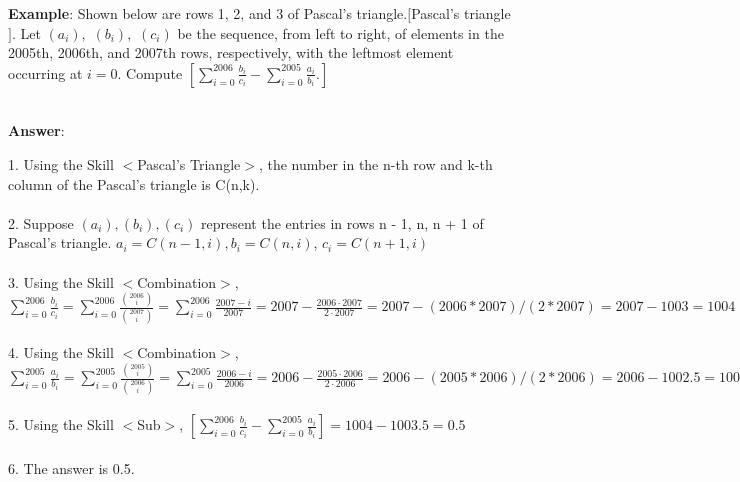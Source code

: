 \documentclass{article} %
\begin{document}
\begin{tcolorbox}[title = {An Example of Skill Composition for MATH}, colback = Apricot!25!white, colframe = BrickRed!75!black] 
\textbf{Example}: Shown below are rows 1, 2, and 3 of Pascal's triangle.$[$Pascal's triangle$]$. Let $(a_i),$ $(b_i),$ $(c_i)$ be the sequence, from left to right, of elements in the 2005th, 2006th, and 2007th rows, respectively, with the leftmost element occurring at $i = 0.$  Compute $[\sum_{i = 0}^{2006} \frac{b_i}{c_i} - \sum_{i = 0}^{2005} \frac{a_i}{b_i}.]$ \\ \\
 \quad

\textbf{Answer}:

1. Using the Skill $<$Pascal's Triangle$>$, the number in the n-th row and k-th column of the Pascal's triangle is C(n,k). \\ \\
2. Suppose $(a_i), (b_i), (c_i)$ represent the entries in rows n - 1, n, n + 1 of Pascal's triangle. $a_i = C(n-1, i), b_i = C(n, i)$, $c_i = C(n+1, i)$ \\ \\
3. Using the Skill $<$Combination$>$, $\sum_{i = 0}^{2006} \frac{b_i}{c_i} = \sum_{i = 0}^{2006} \frac{\binom{2006}{i}}{\binom{2007}{i}} = \sum_{i = 0}^{2006} \frac{2007 - i}{2007} = 2007 - \frac{2006 \cdot 2007}{2 \cdot 2007} = 2007-(2006*2007)/(2*2007) = 2007-1003 = 1004$ \\ \\
4. Using the Skill $<$Combination$>$, $\sum_{i = 0}^{2005} \frac{a_i}{b_i} = \sum_{i = 0}^{2005} \frac{\binom{2005}{i}}{\binom{2006}{i}} = \sum_{i = 0}^{2005} \frac{2006 - i}{2006} = 2006 - \frac{2005 \cdot 2006}{2 \cdot 2006} = 2006-(2005*2006)/(2*2006) = 2006-1002.5 = 1003.5$ \\ \\ 
5. Using the Skill $<$Sub$>$, $[\sum_{i = 0}^{2006} \frac{b_i}{c_i} - \sum_{i = 0}^{2005} \frac{a_i}{b_i}] = 1004-1003.5=0.5$ \\ \\
6. The answer is 0.5. 
\end{tcolorbox}
\noindent\begin{minipage}{\textwidth}   
 \label{Tab:compose_math_skill}
\end{minipage}



\newpage
\end{document}
